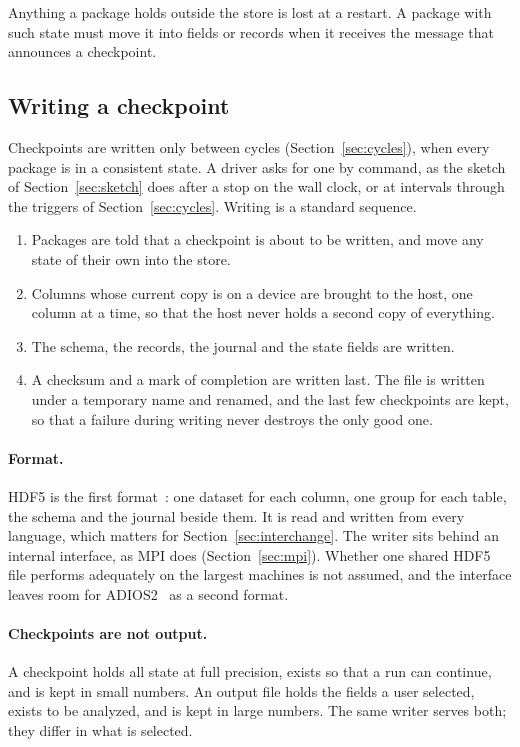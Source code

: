 \documentclass[11pt,a4paper]{article}
\begin{document}
Anything a package holds outside the store is lost at a restart.  A package
with such state must move it into fields or records when it receives the
message that announces a checkpoint.

\subsection{Writing a checkpoint}

Checkpoints are written only between cycles (Section~\ref{sec:cycles}),
when every package is in a consistent state.  A driver asks for one by
command, as the sketch of Section~\ref{sec:sketch} does after a stop on the
wall clock, or at intervals through the triggers of
Section~\ref{sec:cycles}.  Writing is a standard sequence.

\begin{enumerate}
  \item Packages are told that a checkpoint is about to be written, and
        move any state of their own into the store.
  \item Columns whose current copy is on a device are brought to the host,
        one column at a time, so that the host never holds a second copy of
        everything.
  \item The schema, the records, the journal and the state fields are
        written.
  \item A checksum and a mark of completion are written last.  The file is
        written under a temporary name and renamed, and the last few
        checkpoints are kept, so that a failure during writing never
        destroys the only good one.
\end{enumerate}

\paragraph{Format.}  HDF5 is the first format~\cite{hdf5}: one dataset for
each column, one group for each table, the schema and the journal beside
them.  It is read and written from every language, which matters for
Section~\ref{sec:interchange}.  The writer sits behind an internal
interface, as MPI does (Section~\ref{sec:mpi}).  Whether one shared HDF5
file performs adequately on the largest machines is not assumed, and the
interface leaves room for ADIOS2~\cite{adios2} as a second format.

\paragraph{Checkpoints are not output.}  A checkpoint holds all state at
full precision, exists so that a run can continue, and is kept in small
numbers.  An output file holds the fields a user selected, exists to be
analyzed, and is kept in large numbers.  The same writer serves both; they
differ in what is selected.
\end{document}
